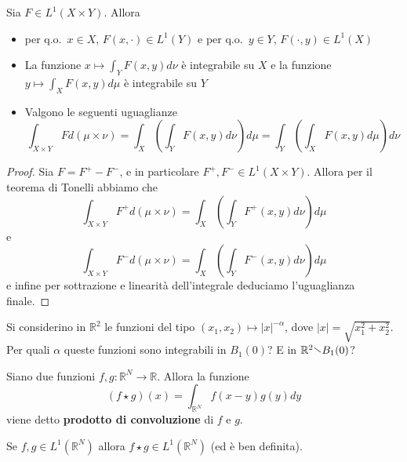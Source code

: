 \begin{theorem}[Fubini]
    Sia \(F \in L^{1}(X \times Y)\). Allora 
\begin{itemize}
    \item per q.o.~\(x \in X\), \(F(x, \cdot ) \in L^{1}(Y)\) e per q.o.~\(y \in
        Y\), \(F(\cdot, y) \in L^{1}(X)\)
    \item La funzione \(\displaystyle x \mapsto \int_Y F(x, y) d\nu\) è
        integrabile su \(X\) e la funzione \(\displaystyle y \mapsto \int_X F(x,
        y) d\mu\) è integrabile su \(Y\)
    \item Valgono le seguenti uguaglianze
        \[
            \int_{X \times Y} F d(\mu \times \nu) = \int_X \left( \int_Y F(x,y)
                d\nu \right) d\mu = \int_Y \left( \int_X F(x,y) d\mu \right) d\nu
        \]
\end{itemize}
\end{theorem}
\begin{proof}
    Sia \(F = F^{+} - F^{-}\), e in particolare \(F^{+}, F^{-} \in L^{1}(X
    \times Y)\). Allora per il teorema di Tonelli abbiamo che
    \[
        \int_{X \times Y} F^{+} d(\mu \times \nu) = \int_X \left( \int_Y F^{+}(x,y)
        d\nu \right) d\mu
    \]
    e
    \[
        \int_{X \times Y} F^{-} d(\mu \times \nu) = \int_X \left( \int_Y F^{-}(x,y)
        d\nu \right) d\mu
    \]
    e infine per sottrazione e linearità dell'integrale deduciamo l'uguaglianza
    finale.
\end{proof}
\begin{eser}
    Si considerino in \(\mathbb{R}^2\) le funzioni del tipo \((x_{1}, x_{2})
    \mapsto |x|^{-\alpha}\), dove \(|x| = \sqrt{x_{1}^2 + x_{2}^2}\). Per quali
    \(\alpha\) queste funzioni sono integrabili in \(B_{1}(0)\)? E in
    \(\mathbb{R}^2 \sminus B_{1}(0)\)?
\end{eser}
\begin{definition}[Convoluzione]
    Siano due funzioni \(f, g : \mathbb{R}^{N} \to \mathbb{R}\). Allora la
    funzione
    \[
        (f \star g)(x) = \int_{\mathbb{R}^{N}} f(x-y) g(y) dy
    \]
    viene detto \textbf{prodotto di convoluzione} di \(f\) e \(g\).
\end{definition}
\begin{proposition}\label{prp:convoluzione_l1}
    Se \(f, g \in L^{1}(\mathbb{R}^{N})\) allora \(f \star g \in
    L^{1}(\mathbb{R}^{N})\) (ed è ben definita).
\end{proposition}
